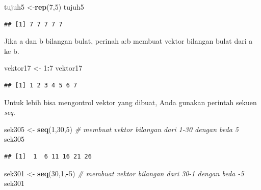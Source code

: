 \documentclass[a4paper, nobind]{templates/ociamthesis}
\newenvironment{Shaded}{\begin{snugshade}}{\end{snugshade}}
\newcommand{\CommentTok}[1]{\textcolor[rgb]{0.56,0.35,0.01}{\textit{#1}}}
\newcommand{\DecValTok}[1]{\textcolor[rgb]{0.00,0.00,0.81}{#1}}
\newcommand{\FunctionTok}[1]{\textcolor[rgb]{0.13,0.29,0.53}{\textbf{#1}}}
\newcommand{\NormalTok}[1]{#1}
\newcommand{\OtherTok}[1]{\textcolor[rgb]{0.56,0.35,0.01}{#1}}
\newcommand{\SpecialCharTok}[1]{\textcolor[rgb]{0.81,0.36,0.00}{\textbf{#1}}}
\renewenvironment{Shaded}
{
  \vspace{10pt}%
  \begin{snugshade}%
}{%
  \end{snugshade}%
  \vspace{8pt}%
}
\begin{document}
\begin{Shaded}
\begin{Highlighting}[]
\NormalTok{tujuh5 }\OtherTok{\textless{}{-}}\FunctionTok{rep}\NormalTok{(}\DecValTok{7}\NormalTok{,}\DecValTok{5}\NormalTok{)}
\NormalTok{tujuh5}
\end{Highlighting}
\end{Shaded}

\begin{verbatim}
## [1] 7 7 7 7 7
\end{verbatim}

Jika a dan b bilangan bulat, perinah a:b membuat vektor bilangan bulat dari a ke b.

\begin{Shaded}
\begin{Highlighting}[]
\NormalTok{vektor17 }\OtherTok{\textless{}{-}} \DecValTok{1}\SpecialCharTok{:}\DecValTok{7}
\NormalTok{vektor17}
\end{Highlighting}
\end{Shaded}

\begin{verbatim}
## [1] 1 2 3 4 5 6 7
\end{verbatim}

Untuk lebih bisa mengontrol vektor yang dibuat, Anda gunakan perintah sekuen \emph{seq}.

\begin{Shaded}
\begin{Highlighting}[]
\NormalTok{sek305 }\OtherTok{\textless{}{-}} \FunctionTok{seq}\NormalTok{(}\DecValTok{1}\NormalTok{,}\DecValTok{30}\NormalTok{,}\DecValTok{5}\NormalTok{) }\CommentTok{\# membuat vektor bilangan dari 1{-}30 dengan beda 5}
\NormalTok{sek305}
\end{Highlighting}
\end{Shaded}

\begin{verbatim}
## [1]  1  6 11 16 21 26
\end{verbatim}

\begin{Shaded}
\begin{Highlighting}[]
\NormalTok{sek301 }\OtherTok{\textless{}{-}} \FunctionTok{seq}\NormalTok{(}\DecValTok{30}\NormalTok{,}\DecValTok{1}\NormalTok{,}\SpecialCharTok{{-}}\DecValTok{5}\NormalTok{) }\CommentTok{\# membuat vektor bilangan dari 30{-}1 dengan beda {-}5}
\NormalTok{sek301}
\end{Highlighting}
\end{Shaded}
\end{document}
